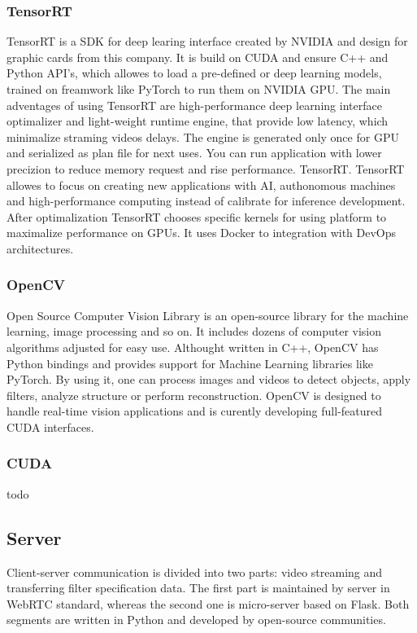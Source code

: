 \documentclass[../Main.tex]{subfiles}
\begin{document}
    \subsubsection{TensorRT} \label{trt_chapter}
    TensorRT is a SDK for deep learing interface created by NVIDIA and design for graphic cards from this company. It is build on CUDA and ensure C++ and Python API's, which allowes to load a pre-defined or deep learning models, trained on freamwork like PyTorch to run them on NVIDIA GPU. The main adventages of using TensorRT are high-performance deep learning interface optimalizer and light-weight runtime engine, that provide low latency, which minimalize straming videos delays. The engine is generated only once for GPU and serialized as plan file for next uses. You can run application with lower precizion to reduce memory request and rise performance. TensorRT. 
    TensorRT allowes to focus on creating new applications with AI, authonomous machines and high-performance computing instead of calibrate for inference development. After optimalization TensorRT chooses specific kernels for using platform to maximalize performance on GPUs. It uses Docker to integration with DevOps architectures.
    
    
    
    \subsubsection{OpenCV}
    Open Source Computer Vision Library is an open-source library for the machine learning, image processing and so on. It includes dozens of computer vision algorithms adjusted for easy use. Althought written in C++, OpenCV has Python bindings and provides support for Machine Learning libraries like PyTorch.  By using it, one can process images and videos to detect objects, apply filters, analyze structure or perform reconstruction. OpenCV is designed to handle real-time vision applications and is curently developing full-featured CUDA interfaces.
    \subsubsection{CUDA}
    todo
    
\newpage
\subsection{Server}
    Client-server communication is divided into two parts: video streaming and transferring filter specification data. The first part is maintained by server in WebRTC standard, whereas the second one is micro-server based on Flask. Both segments are written in Python and developed by open-source communities.
\end{document}
